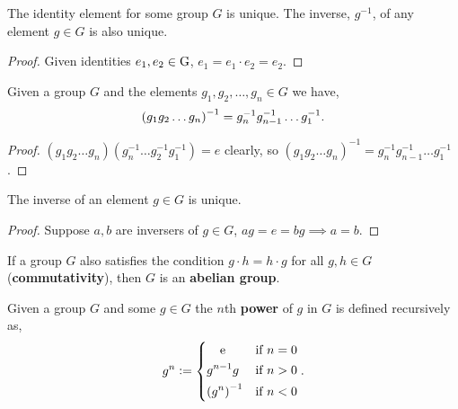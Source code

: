 \documentclass[../Year1.tex]{subfiles}
\begin{document}
\begin{theorem}
    The identity element for some group $G$ is unique. The inverse, $g^{-1}$, of any element $g\in G$ is also unique.
\end{theorem}

\begin{proof}
    Given identities $e_1,e_2\in\mathrm{G}$, $e_1 = e_1\cdot e_2 = e_2$.
\end{proof}

\begingroup\belowdisplayskip=-10pt
\begin{lemma}
    Given a group $G$ and the elements $g_1,g_2,\ldots,g_n\in G$ we have, \[
        {(g_1g_2\dots g_n)}^{-1} = g_n^{-1}g_{n-1}^{-1}\dots g_1^{-1}
        \textcolor{black}{.}
    \]
\end{lemma}
\endgroup

\begin{proof}
    $(g_1g_2\ldots g_n)(g_n^{-1}\ldots g_2^{-1}g_1^{-1}) = e$ clearly, so ${(g_1g_2\dots g_n)}^{-1} = g_n^{-1}g_{n-1}^{-1}\dots g_1^{-1}$.
\end{proof}

\begin{lemma}
    The inverse of an element $g\in G$ is unique.
\end{lemma}

\begin{proof}
    Suppose $a,b$ are inversers of $g\in G$, $ag=e=bg\implies a=b$.
\end{proof}

\begin{definition}
    If a group $G$ also satisfies the condition $g\cdot h = h\cdot g$ for all $g,h\in G$ (\textbf{commutativity}), then $G$ is an \textbf{abelian group}.
\end{definition}

\begin{definition}
    Given a group $G$ and some $g\in G$ the $n$th \textbf{power} of $g$ in $G$ is defined recursively as, \[
        g^n:= \begin{dcases}
            \omit\hfil e  \hfil & \text{\textcolor{black}{if }} n=0 \\
            g^{n-1}g & \text{\textcolor{black}{if }} n>0 \\
            {(g^{n})}^{-1} & \text{\textcolor{black}{if }} n<0 \\
        \end{dcases}
    \textcolor{black}{.}
    \]
\end{definition}
\vspace{-20pt}
\end{document}
